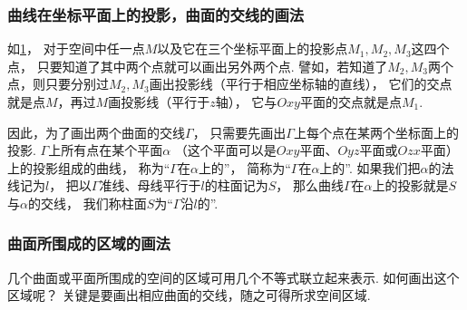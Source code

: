 \subsubsection{曲线在坐标平面上的投影，曲面的交线的画法}
如\cref{figure:解析几何.点在坐标平面上的投影}，
对于空间中任一点\(M\)以及它在三个坐标平面上的投影点\(M_1,M_2,M_3\)这四个点，
只要知道了其中两个点就可以画出另外两个点.
譬如，若知道了\(M_2,M_3\)两个点，则只要分别过\(M_2,M_3\)画出投影线（平行于相应坐标轴的直线），
它们的交点就是点\(M\)，再过\(M\)画投影线（平行于\(z\)轴），
它与\(Oxy\)平面的交点就是点\(M_1\).

\begin{figure}[htb]
	\centering
	\caption{}
	\label{figure:解析几何.点在坐标平面上的投影}
\end{figure}

因此，为了画出两个曲面的交线\(\Gamma\)，
只需要先画出\(\Gamma\)上每个点在某两个坐标面上的投影.
\(\Gamma\)上所有点在某个平面\(\alpha\)
（这个平面可以是\(Oxy\)平面、\(Oyz\)平面或\(Ozx\)平面）
上的投影组成的曲线，
称为“\(\Gamma\)在\(\alpha\)上的”，
简称为“\(\Gamma\)在\(\alpha\)上的”.
如果我们把\(\alpha\)的法线记为\(l\)，
把以\(\Gamma\)准线、母线平行于\(l\)的柱面记为\(S\)，
那么曲线\(\Gamma\)在\(\alpha\)上的投影就是\(S\)与\(\alpha\)的交线，
我们称柱面\(S\)为“\(\Gamma\)沿\(l\)的”.

\subsubsection{曲面所围成的区域的画法}
几个曲面或平面所围成的空间的区域可用几个不等式联立起来表示.
如何画出这个区域呢？
关键是要画出相应曲面的交线，随之可得所求空间区域.

